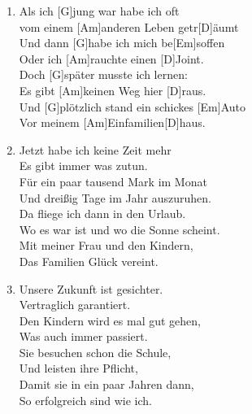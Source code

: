 \def\Titel{Langweiliges-Leben}
\def\Interpret{Mono für Alle!}
\def\Referenz{}

\LiedSetup{}

\begin{guitarMagic}
    \begin{enumerate}
        \item Als ich [G]jung war habe ich oft\\
            vom einem [Am]anderen Leben getr[D]{äu}mt\\
            Und dann [G]habe ich mich be[Em]soffen\\
            Oder ich [Am]rauchte einen [D]Joint.\\
            Doch [G]später musste ich lernen:\\
            Es gibt [Am]keinen Weg hier [D]raus.\\
            Und [G]plötzlich stand ein schickes [Em]Auto\\
            Vor meinem [Am]Einfamilien[D]haus.\\

        \item Jetzt habe ich keine Zeit mehr\\
            Es gibt immer was zutun.\\
            Für ein paar tausend Mark im Monat\\
            Und dreißig Tage im Jahr auszuruhen.\\
            Da fliege ich dann in den Urlaub.\\
            Wo es war ist und wo die Sonne scheint.\\
            Mit meiner Frau und den Kindern,\\
            Das Familien Glück vereint.\\
            \liedweiter

        \item Unsere Zukunft ist gesichter.\\
            Vertraglich garantiert.\\
            Den Kindern wird es mal gut gehen,\\
            Was auch immer passiert.\\
            Sie besuchen schon die Schule,\\
            Und leisten ihre Pflicht,\\
            Damit sie in ein paar Jahren dann,\\
            So erfolgreich sind wie ich.\\


\end{enumerate}
\end{guitarMagic}
